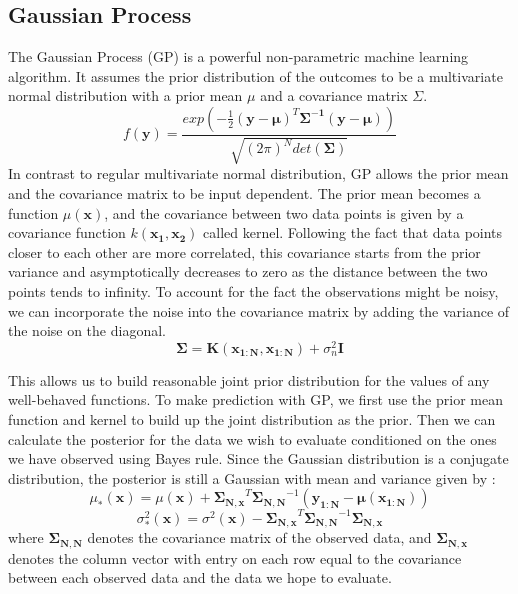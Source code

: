 \documentclass[journal]{IEEEtran}
\begin{document}
\subsection{Gaussian Process}
The Gaussian Process (GP) is a powerful non-parametric machine learning algorithm. 
It assumes the prior distribution of the outcomes to be a multivariate normal distribution with a prior mean $\mu$ and a covariance matrix $\Sigma$. 
\begin{equation}
f(\bm{y}) = \frac{exp(
-\frac{1}{2}(\bm{y} - \bm{\mu})^T \bm{\Sigma^{-1}} (\bm{y} - \bm{\mu})
)}
{
\sqrt{(2\pi)^N det(\bm{\Sigma})}
}
\label{multi_normal}
\end{equation}
In contrast to regular multivariate normal distribution, GP allows the prior mean and the covariance matrix to be input dependent. The
prior mean becomes a function $\mu(\bm{x})$, and the covariance between two data points is given by a covariance function 
$k(\bm{x_1}, \bm{x_2})$ called kernel. 
Following the fact that data points closer to each other are more correlated, this covariance starts from the prior variance and asymptotically decreases to zero as the distance between the two points tends to infinity. 
To account for the fact the observations might be noisy, we can incorporate the noise into the covariance matrix by adding the variance of the noise on the diagonal.
\begin{equation}
\bm{\Sigma} = \bm{K}(\bm{x_{1:N}}, \bm{x_{1:N}}) + \sigma_n^2 \mathbf{I}
\label{covariance_matrix}
\end{equation}

This allows us to build reasonable joint prior distribution for the values of any well-behaved functions.
To make prediction with GP, we first use the prior mean function and kernel to build up the joint distribution as the prior. 
Then we can calculate the posterior for the data we wish to evaluate conditioned on the ones we have observed using Bayes rule.
Since the Gaussian distribution is a conjugate distribution, the posterior is still a Gaussian with mean and variance given by \cite{GP, GP_posterior}:
\begin{equation}
\mu_*(\bm{x}) = \mu(\bm{x}) + 
\bm{\Sigma_{N, x}}^T
\bm{\Sigma_{N, N}}^{-1}
(\bm{y_{1:N}} - \bm{\mu}(\bm{x_{1:N}}))
\label{posterior_mean}
\end{equation}
%
\begin{equation}
\sigma^2_*(\bm{x}) = \sigma^2(\bm{x}) -  
\bm{\Sigma_{N, x}}^T
\bm{\Sigma_{N, N}}^{-1}
\bm{\Sigma_{N, x}}
\label{posterior_var}
\end{equation}
where $\bm{\Sigma_{N, N}}$ denotes the covariance matrix of the observed data, and $\bm{\Sigma_{N, x}}$ denotes the column vector with entry on each row equal to the covariance between 
each observed data and the data we hope to evaluate.
\end{document}
